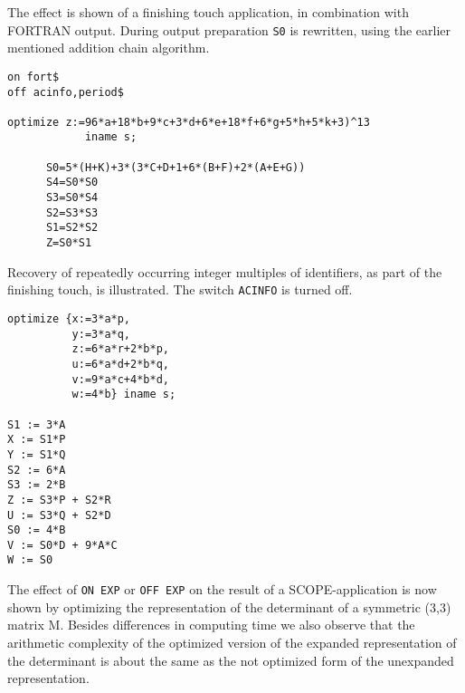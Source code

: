 \example\label{ex:2.2.3}

The effect is shown of a finishing touch application, in combination
with FORTRAN output.  During output preparation {\tt S0} is
rewritten, using the earlier mentioned addition chain algorithm.

{\small
\begin{verbatim}
on fort$
off acinfo,period$

optimize z:=96*a+18*b+9*c+3*d+6*e+18*f+6*g+5*h+5*k+3)^13
            iname s;

      S0=5*(H+K)+3*(3*C+D+1+6*(B+F)+2*(A+E+G))
      S4=S0*S0
      S3=S0*S4
      S2=S3*S3
      S1=S2*S2
      Z=S0*S1
\end{verbatim}}

\example\label{ex:2.2.4}

Recovery of repeatedly occurring integer multiples of identifiers,
as part of the finishing touch, is illustrated. The switch {\tt ACINFO}
is turned off.

\begin{verbatim}
optimize {x:=3*a*p,
          y:=3*a*q,
          z:=6*a*r+2*b*p,
          u:=6*a*d+2*b*q,
          v:=9*a*c+4*b*d,
          w:=4*b} iname s;

S1 := 3*A
X := S1*P
Y := S1*Q
S2 := 6*A
S3 := 2*B
Z := S3*P + S2*R
U := S3*Q + S2*D
S0 := 4*B
V := S0*D + 9*A*C
W := S0
\end{verbatim}

\example\label{ex:2.2.5}

The effect of {\tt ON EXP} or {\tt OFF EXP} on the result of a
SCOPE-application is now shown by optimizing the representation of the
determinant of a symmetric (3,3) matrix M.  Besides differences in
computing time we also observe that the arithmetic complexity of the
optimized version of the expanded representation of the determinant is
about the same as the not optimized form of the unexpanded representation.

